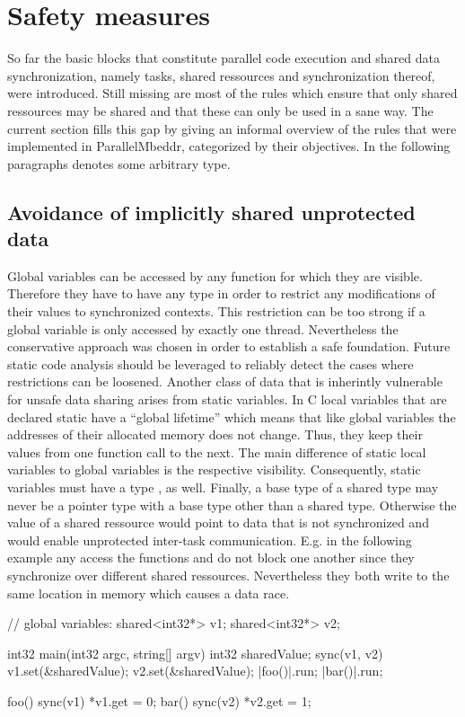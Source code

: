 \section{Safety measures}
\label{safetyMeasures}
So far the basic blocks that constitute parallel code execution and shared data synchronization, namely tasks, shared ressources and synchronization thereof, were introduced. Still missing are most of the rules which ensure that only shared ressources may be shared and that these can only be used in a sane way. The current section fills this gap by giving an informal overview of the rules that were implemented in ParallelMbeddr, categorized by their objectives. In the following paragraphs  denotes some arbitrary type.

\subsection{Avoidance of implicitly shared unprotected data}
Global variables can be accessed by any function for which they are visible. Therefore they have to have any type  in order to restrict any modifications of their values to synchronized contexts. This restriction can be too strong if a global variable is only accessed by exactly one thread. Nevertheless the conservative approach was chosen in order to establish a safe foundation. Future static code analysis should be leveraged to reliably detect the cases where restrictions can be loosened.
Another class of data that is inherintly vulnerable for unsafe data sharing arises from static variables. In C local variables that are declared static have a ``global lifetime''\cite[p.~439]{ProgrammingInC} which means that like global variables the addresses of their allocated memory does not change. Thus, they keep their values from one function call to the next. The main difference of static local variables to global variables is the respective visibility. Consequently, static variables must have a type , as well.
Finally, a base type  of a shared type may never be a pointer type with a base type other than a shared type. Otherwise the value of a shared ressource would point to data that is not synchronized and would enable unprotected inter-task communication. E.g. in the following example any access the functions  and  do not block one another since they synchronize over different shared ressources. Nevertheless they both write to the same location in memory which causes a data race.
\begin{ccode}
// global variables:
shared<int32*> v1;
shared<int32*> v2;

int32 main(int32 argc, string[] argv) {
  int32 sharedValue;
  sync(v1, v2) {
    v1.set(&sharedValue);
    v2.set(&sharedValue);
  }
  |foo()|.run;
  |bar()|.run;
}

foo() {
  sync(v1) { *v1.get = 0; }
}
bar() {
  sync(v2) { *v2.get = 1; }
}
\end{ccode}

